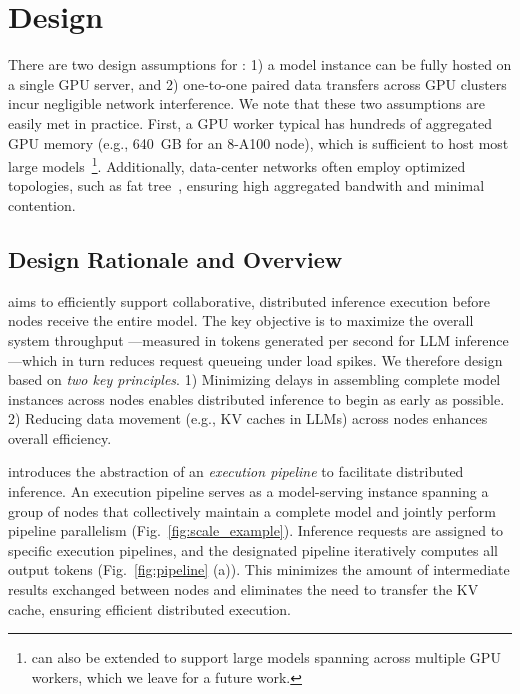 \section{\AlgoName Design}
\label{sec:algo}



There are two design assumptions for \AlgoName: 1) a model instance can be fully hosted on a single GPU server, and 2) one-to-one paired data transfers across GPU clusters incur negligible network interference.
We note that these two assumptions are easily met in practice.
First, a GPU worker typical has hundreds of aggregated GPU memory (e.g., 640~GB for an 8-A100 node), which is sufficient to host most large models~\footnote{\AlgoName can also be extended to support large models spanning across multiple GPU workers, which we leave for a future work.}.
Additionally, data-center networks often employ optimized topologies, such as fat tree~\cite{fattree}, ensuring high aggregated bandwith and minimal contention.
\fi


\subsection{Design Rationale and Overview}

\AlgoName aims to efficiently support collaborative, distributed inference execution before nodes receive the entire model.
The key objective is to maximize the overall system throughput ---measured in tokens generated per second for LLM inference
---which in turn reduces request queueing under load spikes.
We therefore design \AlgoName based on \emph{two key principles}. 
1) Minimizing delays in assembling complete model instances across nodes enables distributed inference to begin as early as possible.
2) Reducing data movement (e.g., KV caches in LLMs) across nodes enhances overall efficiency.

\AlgoName introduces the abstraction of an \emph{execution pipeline} to facilitate distributed inference.
An execution pipeline serves as a model-serving instance spanning a group of nodes that collectively maintain a complete model and jointly perform pipeline parallelism (Fig.~\ref{fig:scale_example}).
Inference requests are assigned to specific execution pipelines, and the designated pipeline iteratively computes all output tokens (Fig.~\ref{fig:pipeline} (a)).
This minimizes the amount of intermediate results exchanged between nodes and eliminates the need to transfer the KV cache, ensuring efficient distributed execution.

